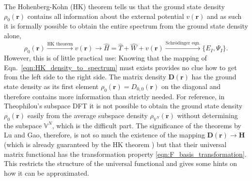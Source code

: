 \documentclass[journal=jpclcd,manuscript=letter]{achemso}
\newcommand\m[1]{\mathbf{#1}}
\renewcommand\vec[1]{\mathbf{#1}}
\begin{document}
The Hohenberg-Kohn (HK) theorem \cite{Hohenberg1964inhomogeneous} tells us that the ground state density $\rho_0(\vec{r})$
contains all information about the external potential $v(\vec{r})$
and as such it is formally possible to obtain the entire spectrum from the ground state density alone,
\begin{equation}
\rho_{0}(\vec{r}) \xrightarrow{\text{HK theorem}} v(\vec{r}) \longrightarrow \hat{H} = \hat{T} + \hat{W} + v(\vec{r}) \xrightarrow{\text{Schr\"{o}dinger eqn.}} \{ E_I, \Psi_I \}.
\label{eqn:HK_density_to_spectrum}
\end{equation}
However, this is of little practical use: Knowing that the mapping of Eqn.~\ref{eqn:HK_density_to_spectrum}
must exists provides no clue how to get from the left side to the right side.
 The matrix density $\m{D}(\vec{r})$ has the ground state density as its first element $\rho_{0}(\vec{r}) = D_{0,0}(\vec{r})$ on the diagonal
and therefore contains more information than strictly needed. For reference, in Theophilou's subspace DFT it is not possible to obtain the
ground state density $\rho_0(\vec{r})$ easily from the average subspace density $\rho_{\mathbb{V}^N}(\vec{r})$ without determining the subspace
$\mathbb{V}^N$, which is the difficult part.
The significance of the theorems by Lu and Gao, therefore, is not so much the existence of the mapping $\m{D}(\vec{r}) \to \m{H}$ (which is already
guaranteed by the HK theorem \cite{Goerling1996density}) but that their
universal matrix functional has the transformation property \ref{eqn:F_basis_transformation}.
This restricts the structure of the universal functional and gives some hints on how it can be approximated.
\end{document}
